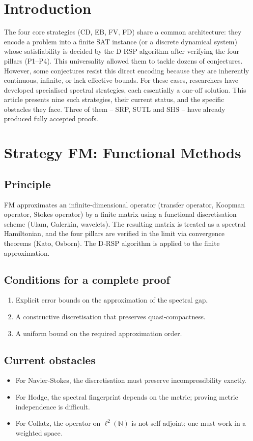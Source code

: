 \documentclass[11pt,a4paper]{article}
\begin{document}
\section{Introduction}

The four core strategies (CD, EB, FV, FD) share a common architecture: they encode a problem into a finite SAT instance (or a discrete dynamical system) whose satisfiability is decided by the D‑RSP algorithm after verifying the four pillars (P1–P4). This universality allowed them to tackle dozens of conjectures. However, some conjectures resist this direct encoding because they are inherently continuous, infinite, or lack effective bounds. For these cases, researchers have developed specialised spectral strategies, each essentially a one‑off solution. This article presents nine such strategies, their current status, and the specific obstacles they face. Three of them – SRP, SUTL and SHS – have already produced fully accepted proofs.

\section{Strategy FM: Functional Methods}

\subsection{Principle}
FM approximates an infinite‑dimensional operator (transfer operator, Koopman operator, Stokes operator) by a finite matrix using a functional discretisation scheme (Ulam, Galerkin, wavelets). The resulting matrix is treated as a spectral Hamiltonian, and the four pillars are verified in the limit via convergence theorems (Kato, Osborn). The D‑RSP algorithm is applied to the finite approximation.

\subsection{Conditions for a complete proof}
\begin{enumerate}
\item Explicit error bounds on the approximation of the spectral gap.
\item A constructive discretisation that preserves quasi‑compactness.
\item A uniform bound on the required approximation order.
\end{enumerate}

\subsection{Current obstacles}
\begin{itemize}
\item For Navier‑Stokes, the discretisation must preserve incompressibility exactly.
\item For Hodge, the spectral fingerprint depends on the metric; proving metric independence is difficult.
\item For Collatz, the operator on \(\ell^2(\mathbb{N})\) is not self‑adjoint; one must work in a weighted space.
\end{itemize}
\end{document}
